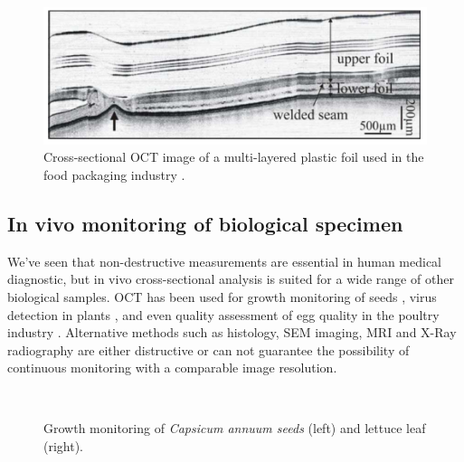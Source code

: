 \begin{figure}[hbt]
	\myfloatalign
	\includegraphics[width=0.5\linewidth]{gfx/ch1/material}
	\caption{Cross-sectional OCT image of a multi-layered plastic foil used in the food packaging industry \citep{Wiesauer2005}.}\label{fig:material}
\end{figure}

\subsection{In vivo monitoring of biological specimen}
We've seen that non-destructive measurements are essential in human medical diagnostic, but in vivo cross-sectional analysis is suited for a wide range of other biological samples. OCT has been used for growth monitoring of seeds \cite{Ravichandran2017}, virus detection in plants \cite{Chow2009}, and even quality assessment of egg quality in the poultry industry \cite{Sabuncu2015}. Alternative methods such as histology, \ac{SEM} imaging, \ac{MRI} and X-Ray radiography are either distructive or can not guarantee the possibility of continuous monitoring with a comparable image resolution.

\begin{figure}[hbt]
	\myfloatalign
	 \quad
	\\
	\caption{Growth monitoring of \emph{Capsicum annuum seeds} \cite{Ravichandran2017} (left) and lettuce leaf \cite{Loeb2003} (right).}\label{fig:plant-monitoring}
\end{figure}

